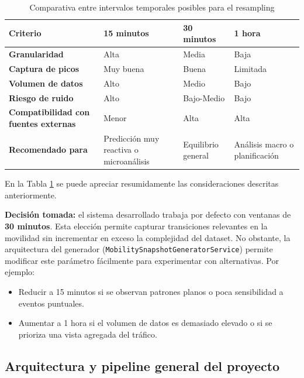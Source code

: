 \begin{table}[H]
	\centering
	\small
	\caption{Comparativa entre intervalos temporales posibles para el resampling}
	\label{tab:resample_comparison}
	\begin{tabularx}{\textwidth}{lXXX}
		\toprule
		\textbf{Criterio} & \textbf{15 minutos} & \textbf{30 minutos} & \textbf{1 hora} \\
		\midrule
		\textbf{Granularidad} & Alta & Media & Baja \\
		\textbf{Captura de picos} & Muy buena & Buena & Limitada \\
		\textbf{Volumen de datos} & Alto & Medio & Bajo \\
		\textbf{Riesgo de ruido} & Alto & Bajo-Medio & Bajo \\
		\textbf{Compatibilidad con fuentes externas} & Menor & Alta & Alta \\
		\textbf{Recomendado para} &
		Predicción muy reactiva o microanálisis &
		Equilibrio general &
		Análisis macro o planificación \\
		\bottomrule
	\end{tabularx}
\end{table}

En la Tabla \ref{tab:resample_comparison} se puede apreciar resumidamente las consideraciones descritas anteriormente.

\vspace{1em}
\noindent \textbf{Decisión tomada:} el sistema desarrollado trabaja por defecto con ventanas de \textbf{30 minutos}. Esta elección permite capturar transiciones relevantes en la movilidad sin incrementar en exceso la complejidad del dataset. No obstante, la arquitectura del generador (\texttt{MobilitySnapshotGeneratorService}) permite modificar este parámetro fácilmente para experimentar con alternativas. Por ejemplo:

\begin{itemize}
	\item Reducir a 15 minutos si se observan patrones planos o poca sensibilidad a eventos puntuales.
	\item Aumentar a 1 hora si el volumen de datos es demasiado elevado o si se prioriza una vista agregada del tráfico.
\end{itemize}

\subsection{Arquitectura y pipeline general del proyecto}

